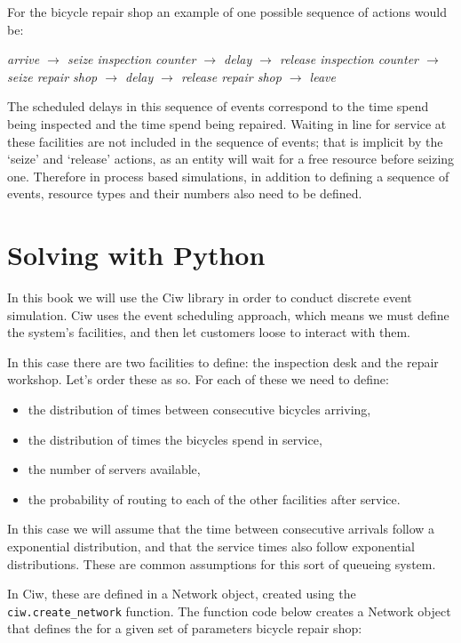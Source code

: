 For the bicycle repair shop an example of one possible sequence of actions would
be:

\textit{arrive $\rightarrow$ seize inspection counter $\rightarrow$ delay $\rightarrow$ release inspection counter $\rightarrow$ seize repair shop $\rightarrow$ delay $\rightarrow$ release repair shop $\rightarrow$ leave}

The scheduled delays in this sequence of events correspond to the time spend
being inspected and the time spend being repaired. Waiting in line for service
at these facilities are not included in the sequence of events; that is implicit
by the `seize' and `release' actions, as an entity will wait for a free resource
before seizing one.
Therefore in process based simulations, in addition to defining a sequence of
events, resource types and their numbers also need to be defined.


\section{Solving with Python}\label{sec:solving-with-python}

In this book we will use the Ciw library in order to conduct discrete event
simulation.
Ciw uses the event scheduling approach, which means we must define the system's
facilities, and then let customers loose to interact with them.

In this case there are two facilities to define: the inspection desk and the
repair workshop. Let's order these as so. For each of these we need to define:

\begin{itemize}
  \item the distribution of times between consecutive bicycles arriving,
  \item the distribution of times the bicycles spend in service,
  \item the number of servers available,
  \item the probability of routing to each of the other facilities after
  service.
\end{itemize}

In this case we will assume that the time between consecutive arrivals follow a
exponential distribution, and that the service times also follow exponential
distributions. These are common assumptions for this sort of queueing system.

In Ciw, these are defined in a Network object, created using the
\texttt{ciw.create_network} function. The function code below
creates a Network object that defines the for a given set of parameters bicycle
repair shop:


